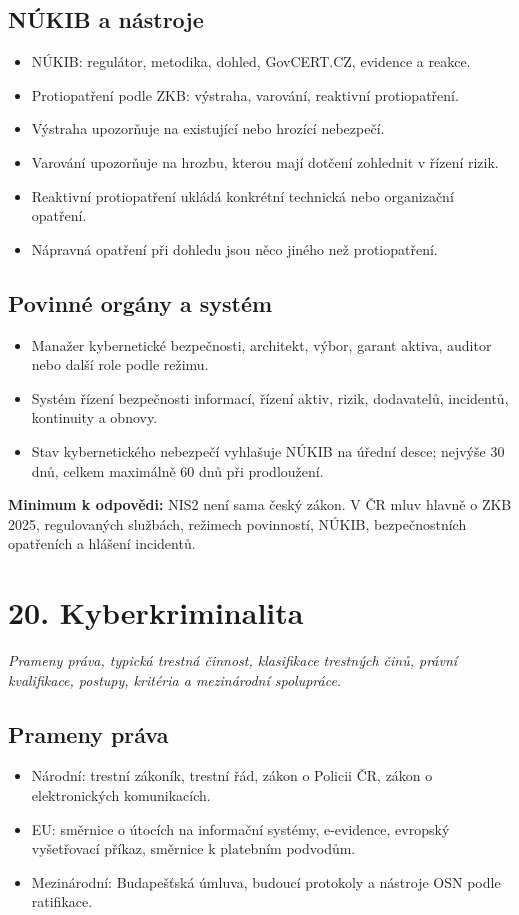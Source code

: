 \documentclass[10pt,a4paper]{article}
\newcommand{\otazka}[2]{\section*{#1}\addcontentsline{toc}{section}{#1}\textit{#2}\par\medskip}
\newcommand{\must}[1]{\colorbox{blue!7}{\parbox{\dimexpr\linewidth-2\fboxsep}{\textbf{Minimum k odpovědi:} #1}}\par\medskip}
\newcommand{\blok}[1]{\subsection*{#1}}
\begin{document}
\blok{NÚKIB a nástroje}
\begin{itemize}
  \item NÚKIB: regulátor, metodika, dohled, GovCERT.CZ, evidence a reakce.
  \item Protiopatření podle ZKB: výstraha, varování, reaktivní protiopatření.
  \item Výstraha upozorňuje na existující nebo hrozící nebezpečí.
  \item Varování upozorňuje na hrozbu, kterou mají dotčení zohlednit v řízení rizik.
  \item Reaktivní protiopatření ukládá konkrétní technická nebo organizační opatření.
  \item Nápravná opatření při dohledu jsou něco jiného než protiopatření.
\end{itemize}

\blok{Povinné orgány a systém}
\begin{itemize}
  \item Manažer kybernetické bezpečnosti, architekt, výbor, garant aktiva, auditor nebo další role podle režimu.
  \item Systém řízení bezpečnosti informací, řízení aktiv, rizik, dodavatelů, incidentů, kontinuity a obnovy.
  \item Stav kybernetického nebezpečí vyhlašuje NÚKIB na úřední desce; nejvýše 30 dnů, celkem maximálně 60 dnů při prodloužení.
\end{itemize}

\must{NIS2 není sama český zákon. V ČR mluv hlavně o ZKB 2025, regulovaných službách, režimech povinností, NÚKIB, bezpečnostních opatřeních a hlášení incidentů.}

\newpage

\otazka{20. Kyberkriminalita}{Prameny práva, typická trestná činnost, klasifikace trestných činů, právní kvalifikace, postupy, kritéria a mezinárodní spolupráce.}

\blok{Prameny práva}
\begin{itemize}
  \item Národní: trestní zákoník, trestní řád, zákon o Policii ČR, zákon o elektronických komunikacích.
  \item EU: směrnice o útocích na informační systémy, e-evidence, evropský vyšetřovací příkaz, směrnice k platebním podvodům.
  \item Mezinárodní: Budapešťská úmluva, budoucí protokoly a nástroje OSN podle ratifikace.
\end{itemize}
\end{document}
